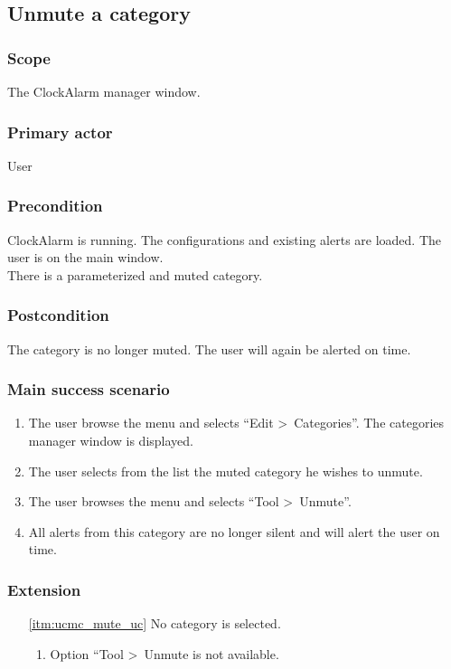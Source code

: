 \subsection{Unmute a category}\label{subsec:usecase_unmute_category}

\subsubsection{Scope}
The ClockAlarm manager window.
\subsubsection{Primary actor}
User
\subsubsection{Precondition}
ClockAlarm is running. The configurations and existing alerts are loaded. The user is on the main window.
\\There is a parameterized and muted category.
\subsubsection{Postcondition}
The category is no longer muted. The user will again be alerted on time.
\subsubsection{Main success scenario}
\begin{enumerate}
	\item The user browse the menu and selects ``Edit \textgreater~Categories''. The categories manager window is displayed. 
	\item The user selects from the list the muted category he wishes to unmute.
	\item \label{itm:ucmc_mute_uc}The user browses the menu and selects ``Tool \textgreater~Unmute''.
	\item All alerts from this category are no longer silent and will alert the user on time.
\end{enumerate}
\subsubsection{Extension}
\begin{enumerate}
	\item[\ref{itm:ucmc_mute_uc}] No category is selected.
	\begin{enumerate}[i]
		\item Option ``Tool \textgreater~Unmute is not available.
	\end{enumerate}
\end{enumerate}